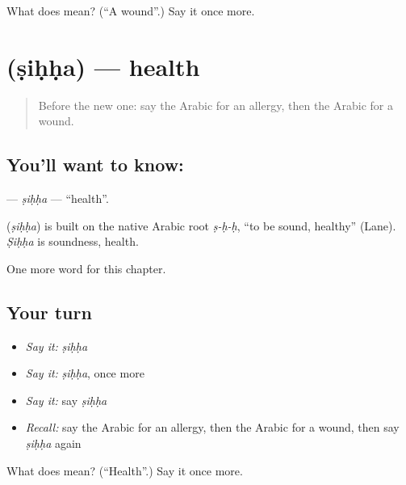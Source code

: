 \begin{tcolorbox}[breakable,colback=teal!4,colframe=teal!35!black,title={Before you move on}]
What does  mean? (\textquotedblleft{}A wound\textquotedblright{}.) Say it once more.
\end{tcolorbox}
\section[\texorpdfstring{\ar{صحة} (ṣiḥḥa)}{صحة (ṣiḥḥa)}]{ (ṣiḥḥa) — health}

\label{lesson:AR-C200-sihha}



\begin{quote}
Before the new one: say the Arabic for an allergy, then the Arabic for a wound.
\end{quote}

\subsection*{You'll want to know: }
\textbf{} — \emph{ṣiḥḥa} — \textquotedblleft{}health\textquotedblright{}.

\begin{cousinweb}
\textbf{} (\emph{ṣiḥḥa}) is built on the native Arabic root \emph{ṣ-ḥ-ḥ}, \textquotedblleft{}to be sound, healthy\textquotedblright{} (Lane). \emph{Ṣiḥḥa} is soundness, health.
\end{cousinweb}

\begin{grammarlens}[title={What you've built}]
One more word for this chapter.
\end{grammarlens}

\subsection*{Your turn}
\begin{itemize}
\raggedright
  \item \emph{Say it:} \emph{ṣiḥḥa}
  \item \emph{Say it:} \emph{ṣiḥḥa}, once more
  \item \emph{Say it:} say \emph{ṣiḥḥa}
  \item \emph{Recall:} say the Arabic for an allergy, then the Arabic for a wound, then say \emph{ṣiḥḥa} again
\end{itemize}

\begin{tcolorbox}[breakable,colback=teal!4,colframe=teal!35!black,title={Before you move on}]
What does  mean? (\textquotedblleft{}Health\textquotedblright{}.) Say it once more.
\end{tcolorbox}
